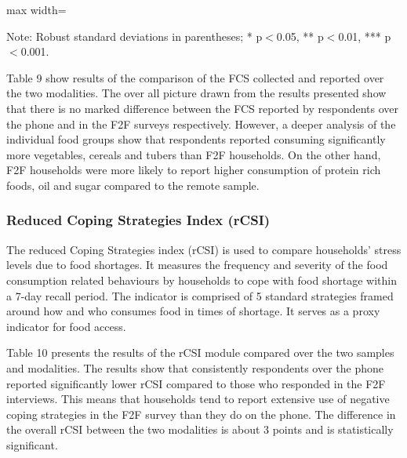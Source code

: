 \documentclass[11pt,harvard]{article}
\begin{document}
	\begin{table}[htbp]
		\centering
		\begin{adjustbox}{max width=\textwidth}
			\begin{threeparttable}
				\caption{Impact of Survey Modality on Food Consumption Score and Food Groups}
				\small%
				 
				\label{tab:FCS_Modality_BF}
				\begin{tablenotes}
					\item Note: Robust standard deviations in parentheses; * p$<$0.05, ** p$<$0.01, *** p$<$0.001.
				\end{tablenotes}
			\end{threeparttable}
		\end{adjustbox}
	\end{table}
	
	Table 9 show results of the comparison of the FCS collected and reported over the two modalities. The over all picture drawn from the results presented show that there is no marked difference between the FCS reported by respondents over the phone and in the F2F surveys respectively. However, a deeper analysis of the individual food groups show that respondents reported consuming significantly more vegetables, cereals and tubers than F2F households. On the other hand, F2F households were more likely to report higher consumption of protein rich foods, oil and sugar compared to the remote sample.
	
	
	
	
	\subsubsection{Reduced Coping Strategies Index (rCSI)}
	
	The reduced Coping Strategies index (rCSI) is used to compare households’ stress levels due to food shortages. It measures the frequency and severity of the food consumption related behaviours by households to cope with food shortage within a 7-day recall period. The indicator is comprised of 5 standard strategies framed around how and who consumes food in times of shortage. It serves as a proxy indicator for food access.
	
	Table 10 presents the results of the rCSI module compared over the two samples and modalities. The results show that consistently respondents over the phone reported significantly lower rCSI compared to those who responded in the F2F interviews.	This means that households tend to report extensive use of negative coping strategies in the F2F survey than they do on the phone. The difference in the overall rCSI between the two modalities is about 3 points and is statistically significant. 
	
\end{document}
